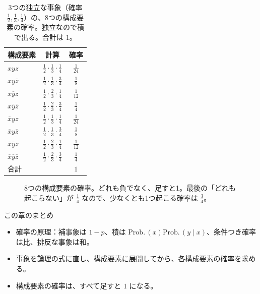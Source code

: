 \documentclass[a4paper,11pt,openany]{ltjsbook}
\newcommand{\nx}[1]{\overline{#1}}
\newcommand{\Prob}{\mathrm{Prob.}\,}
\begin{document}
\begin{table}[htbp]
\centering
\begin{tabular}{lcc}
\toprule
構成要素 & 計算 & 確率\\
\midrule
$xyz$ & $\tfrac12\cdot\tfrac13\cdot\tfrac14$ & $\tfrac1{24}$\\
$xy\nx z$ & $\tfrac12\cdot\tfrac13\cdot\tfrac34$ & $\tfrac18$\\
$x\nx yz$ & $\tfrac12\cdot\tfrac23\cdot\tfrac14$ & $\tfrac1{12}$\\
$x\nx y\nx z$ & $\tfrac12\cdot\tfrac23\cdot\tfrac34$ & $\tfrac14$\\
$\nx xyz$ & $\tfrac12\cdot\tfrac13\cdot\tfrac14$ & $\tfrac1{24}$\\
$\nx xy\nx z$ & $\tfrac12\cdot\tfrac13\cdot\tfrac34$ & $\tfrac18$\\
$\nx x\nx yz$ & $\tfrac12\cdot\tfrac23\cdot\tfrac14$ & $\tfrac1{12}$\\
$\nx x\nx y\nx z$ & $\tfrac12\cdot\tfrac23\cdot\tfrac34$ & $\tfrac14$\\
\midrule
合計 & & $1$\\
\bottomrule
\end{tabular}
\caption{3つの独立な事象（確率 $\tfrac12,\tfrac13,\tfrac14$）の、8つの構成要素の確率。独立なので積で出る。合計は $1$。}
\end{table}

\begin{figure}[htbp]
\centering
{}
\caption{8つの構成要素の確率。どれも負でなく、足すと1。最後の「どれも起こらない」が $\tfrac14$ なので、少なくとも1つ起こる確率は $\tfrac34$。}
\end{figure}

\begin{pointbox}{この章のまとめ}
\begin{itemize}[leftmargin=*]
\item 確率の原理：補事象は $1-p$、積は $\Prob(x)\Prob(y\mid x)$、条件つき確率は比、排反な事象は和。
\item 事象を論理の式に直し、構成要素に展開してから、各構成要素の確率を求める。
\item 構成要素の確率は、すべて足すと $1$ になる。
\end{itemize}
\end{pointbox}
\end{document}

